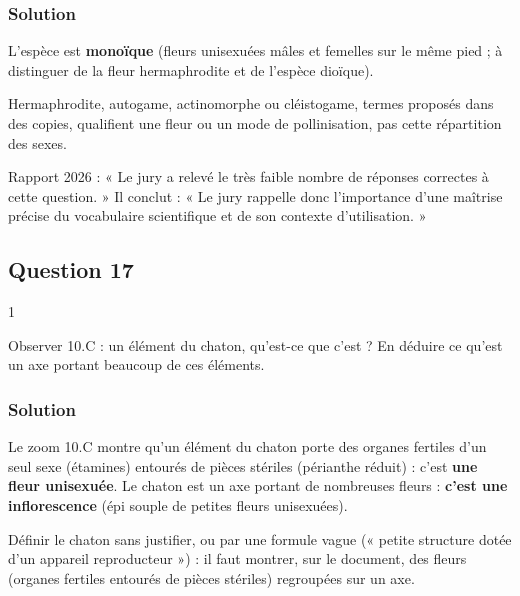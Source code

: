 \documentclass[11pt,a4paper]{article}
\begin{document}
\hypertarget{solution-15}{%
\subsubsection{Solution}\label{solution-15}}

L'espèce est \textbf{monoïque} (fleurs unisexuées mâles et femelles sur le même pied ; à distinguer de la fleur hermaphrodite et de l'espèce dioïque).

\begin{piege}

Hermaphrodite, autogame, actinomorphe ou cléistogame, termes proposés dans des copies, qualifient une fleur ou un mode de pollinisation, pas cette répartition des sexes.

\end{piege}

\begin{jury}

Rapport 2026 : « Le jury a relevé le très faible nombre de réponses correctes à cette question. » Il conclut : « Le jury rappelle donc l'importance d'une maîtrise précise du vocabulaire scientifique et de son contexte d'utilisation. »

\end{jury}

\hypertarget{question-17}{%
\subsection{Question 17}\label{question-17}}

\begin{indication}{1}

Observer 10.C : un élément du chaton, qu'est-ce que c'est ? En déduire ce qu'est un axe portant beaucoup de ces éléments.

\end{indication}

\hypertarget{solution-16}{%
\subsubsection{Solution}\label{solution-16}}

Le zoom 10.C montre qu'un élément du chaton porte des organes fertiles d'un seul sexe (étamines) entourés de pièces stériles (périanthe réduit) : c'est \textbf{une fleur unisexuée}. Le chaton est un axe portant de nombreuses fleurs : \textbf{c'est une inflorescence} (épi souple de petites fleurs unisexuées).

\begin{piege}

Définir le chaton sans justifier, ou par une formule vague (« petite structure dotée d'un appareil reproducteur ») : il faut montrer, sur le document, des fleurs (organes fertiles entourés de pièces stériles) regroupées sur un axe.

\end{piege}
\end{document}
